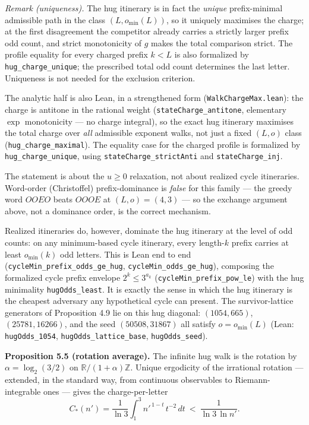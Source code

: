 \documentclass[12pt]{article}
\begin{document}
\emph{Remark (uniqueness).} The hug itinerary is in fact the
\emph{unique} prefix-minimal admissible path in the class
\((L,o_{\min}(L))\), so it uniquely maximises the charge; at the first
disagreement the competitor already carries a strictly larger prefix odd
count, and strict monotonicity of \(g\) makes the total comparison
strict. The profile equality for every charged prefix \(k<L\) is also
formalized by \texttt{\nolinkurl{hug_charge_unique}}; the prescribed
total odd count determines the last letter. Uniqueness is not needed for
the exclusion criterion.

The analytic half is also Lean, in a strengthened form
(\texttt{\nolinkurl{WalkChargeMax.lean}}): the charge is antitone in the
rational weight (\texttt{\nolinkurl{stateCharge_antitone}}, elementary
\(\exp\) monotonicity --- no charge integral), so the exact hug
itinerary maximises the total charge over \emph{all} admissible exponent
walks, not just a fixed \((L,o)\) class
(\texttt{\nolinkurl{hug_charge_maximal}}). The equality case for the
charged profile is formalized by \texttt{\nolinkurl{hug_charge_unique}},
using \texttt{\nolinkurl{stateCharge_strictAnti}} and
\texttt{\nolinkurl{stateCharge_inj}}.

The statement is about the \(u\ge 0\) relaxation, not about realized
cycle itineraries. Word-order (Christoffel) prefix-dominance is
\emph{false} for this family --- the greedy word \(OOEO\) beats \(OOOE\)
at \((L,o)=(4,3)\) --- so the exchange argument above, not a dominance
order, is the correct mechanism.

Realized itineraries do, however, dominate the hug itinerary at the
level of odd counts: on any minimum-based cycle itinerary, every
length-\(k\) prefix carries at least \(o_{\min}(k)\) odd letters. This
is Lean end to end (\texttt{\nolinkurl{cycleMin_prefix_odds_ge_hug}},
\texttt{\nolinkurl{cycleMin_odds_ge_hug}}), composing the formalized
cycle prefix envelope \(2^k\le 3^{a_k}\)
(\texttt{\nolinkurl{cycleMin_prefix_pow_le}}) with the hug minimality
\texttt{\nolinkurl{hugOdds_least}}. It is exactly the sense in which the
hug itinerary is the cheapest adversary any hypothetical cycle can
present. The survivor-lattice generators of Proposition 4.9 lie on this
hug diagonal: \((1054,665)\), \((25781,16266)\), and the seed
\((50508,31867)\) all satisfy \(o=o_{\min}(L)\) (Lean:
\texttt{\nolinkurl{hugOdds_1054}},
\texttt{\nolinkurl{hugOdds_lattice_base}},
\texttt{\nolinkurl{hugOdds_seed}}).

\textbf{Proposition 5.5 (rotation average).} The infinite hug walk is
the rotation by \(\alpha=\log_2(3/2)\) on
\(\mathbb R/(1+\alpha)\mathbb Z\). Unique ergodicity of the irrational
rotation --- extended, in the standard way, from continuous observables
to Riemann-integrable ones --- gives the charge-per-letter \[
C_*(n')=\frac1{\ln 3}\int_1^3 n'^{\,1-t}\,t^{-2}\,dt
\ <\ \frac1{\ln 3\,\ln n'} .
\]
\end{document}

